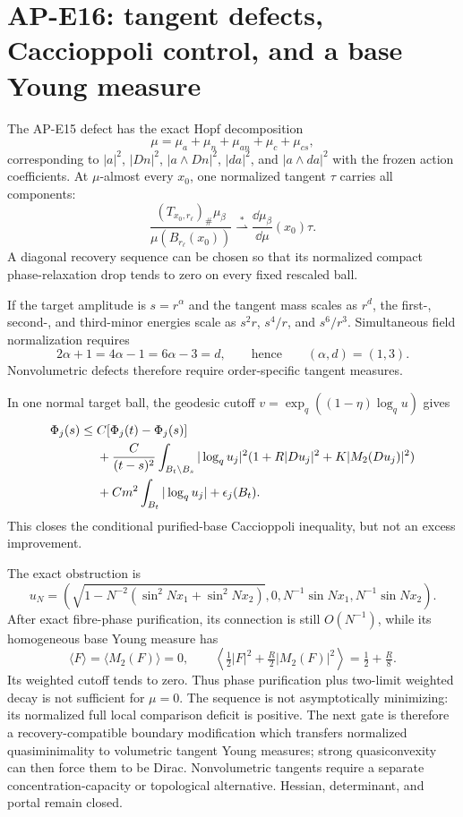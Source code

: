 \section{AP-E16: tangent defects, Caccioppoli control, and a base Young measure}

The AP-E15 defect has the exact Hopf decomposition
\begin{equation}
 \mu=\mu_a+\mu_n+\mu_{an}+\mu_c+\mu_{cs},
\end{equation}
corresponding to $|a|^2$, $|Dn|^2$, $|a\wedge Dn|^2$, $|da|^2$, and
$|a\wedge da|^2$ with the frozen action coefficients.  At $\mu$-almost every
$x_0$, one normalized tangent $\tau$ carries all components:
\begin{equation}
 \frac{(T_{x_0,r_\ell})_\#\mu_\beta}{\mu(B_{r_\ell}(x_0))}
 \stackrel{*}{\rightharpoonup}
 \frac{\dd\mu_\beta}{\dd\mu}(x_0)\tau .
\end{equation}
A diagonal recovery sequence can be chosen so that its normalized compact
phase-relaxation drop tends to zero on every fixed rescaled ball.

If the target amplitude is $s=r^\alpha$ and the tangent mass scales as
$r^d$, the first-, second-, and third-minor energies scale as
$s^2r$, $s^4/r$, and $s^6/r^3$.  Simultaneous field normalization requires
\begin{equation}
 2\alpha+1=4\alpha-1=6\alpha-3=d,
 \qquad\text{hence}\qquad(\alpha,d)=(1,3).
\end{equation}
Nonvolumetric defects therefore require order-specific tangent measures.

In one normal target ball, the geodesic cutoff
$v=\exp_q((1-\eta)\log_q u)$ gives
\begin{align}
 \Phi_j(s)\leq{}&C[\Phi_j(t)-\Phi_j(s)]\notag\\
 &+\frac{C}{(t-s)^2}\int_{B_t\setminus B_s}|\log_q u_j|^2
 (1+R|Du_j|^2+K|M_2(Du_j)|^2)\notag\\
 &+Cm^2\int_{B_t}|\log_q u_j|+\epsilon_j(B_t).
\end{align}
This closes the conditional purified-base Caccioppoli inequality, but not an
excess improvement.

The exact obstruction is
\begin{equation}
 u_N=\left(
 \sqrt{1-N^{-2}(\sin^2Nx_1+\sin^2Nx_2)},0,
 N^{-1}\sin Nx_1,N^{-1}\sin Nx_2\right).
\end{equation}
After exact fibre-phase purification, its connection is still $O(N^{-1})$,
while its homogeneous base Young measure has
\begin{equation}
 \langle F\rangle=\langle M_2(F)\rangle=0,\qquad
 \left\langle\tfrac12|F|^2+\tfrac R2|M_2(F)|^2\right\rangle
 =\tfrac12+\tfrac R8.
\end{equation}
Its weighted cutoff tends to zero.  Thus phase purification plus two-limit
weighted decay is not sufficient for $\mu=0$.  The sequence is not
asymptotically minimizing: its normalized full local comparison deficit is
positive.  The next gate is therefore a recovery-compatible boundary
modification which transfers normalized quasiminimality to volumetric
tangent Young measures; strong quasiconvexity can then force them to be
Dirac.  Nonvolumetric tangents require a separate concentration-capacity or
topological alternative.  Hessian, determinant, and portal remain closed.
